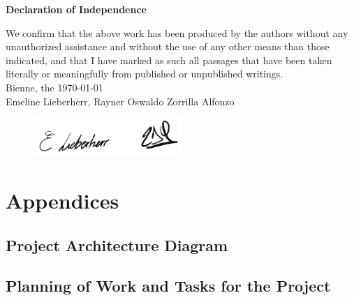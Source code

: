 \documentclass[12pt,a4paper]{scrartcl}
\begin{document}
\markboth{}{}

\newpage



\newpage

\markboth{}{}
  \normalsize
\begin{center}
\huge{\textbf{ Declaration of Independence}}\\[40mm]
\end{center}
\large
We confirm that the above work has been produced by the authors without any unauthorized assistance and without the use of any other means than those indicated, and that I have marked as such all passages that have been taken literally or meaningfully from published or unpublished writings.\\[30mm]
Bienne, the \today \\[10mm]
Emeline Lieberherr, Rayner Oswaldo Zorrilla Alfonzo
\begin{figure}[H]
    \includegraphics[width=0.5\textwidth]{./images/signatures.png}
\end{figure}

\newpage
\appendix
\section*{Appendices}
\renewcommand{\thesubsection}{\Alph{subsection}}

\subsection{Project Architecture Diagram}


\subsection{Planning of Work and Tasks for the Project}

\end{document}
